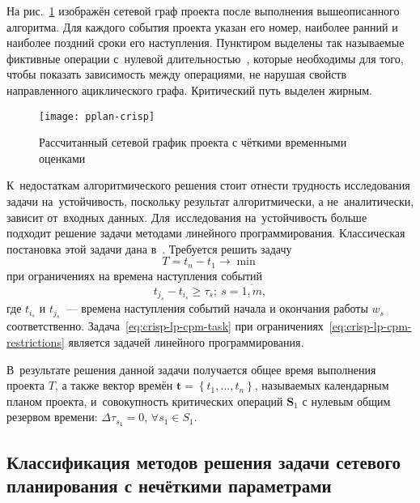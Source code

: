 На рис.~\ref{fig:pplan-crisp} изображён сетевой граф проекта после выполнения вышеописанного алгоритма. Для каждого события проекта указан его номер, наиболее ранний и наиболее поздний сроки его наступления. Пунктиром выделены так называемые фиктивные операции с~нулевой длительностью~\cite{Eddous, Taha_Operation_Research}, которые необходимы для того, чтобы показать зависимость между операциями, не нарушая свойств направленного ациклического графа. Критический путь выделен жирным.
\begin{figure}[h!]
  \centering
  {
    \texttt{[image: pplan-crisp]}
    \caption{Рассчитанный сетевой график проекта с чёткими временными оценками}
    \label{fig:pplan-crisp}
  }
\end{figure}

К~недостаткам алгоритмического решения стоит отнести трудность исследования задачи на~устойчивость, поскольку результат алгоритмически, а не~аналитически, зависит от~входных данных. Для~исследования на~устойчивость больше подходит решение задачи методами линейного программирования. Классическая постановка этой задачи дана в~\cite{Kosorukov_Mischenko}. Требуется решить задачу
\begin{equation}
\label{eq:crisp-lp-cpm-task}
  T=t_n-t_1 \to \min
\end{equation}
при ограничениях на времена наступления событий
\begin{equation}
\label{eq:crisp-lp-cpm-restrictions}
  t_{j_s}-t_{i_s}\geqslant \tau_s;\ s=\overline{1,m},
\end{equation}
где $t_{i_s}$ и $t_{j_s}$~--- времена наступления событий начала и окончания работы $w_s$ соответственно. Задача~\eqref{eq:crisp-lp-cpm-task} при ограничениях~\eqref{eq:crisp-lp-cpm-restrictions} является задачей линейного программирования.

В~результате решения данной задачи получается общее время выполнения проекта $T$, а также вектор времён $\mathbf{t}=\left\{ t_1, \ldots, t_n \right\}$, называемых календарным планом проекта, и~совокупность критических операций $\mathbf{S}_1$ с нулевым общим резервом времени: $\Delta \tau_{s_1}=0$, $\forall s_1 \in S_1$.

\subsection{Классификация методов решения задачи сетевого планирования с нечёткими параметрами}

